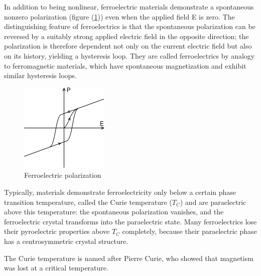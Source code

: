 \documentclass[%
 aip,
 amsmath,amssymb,
 reprint, floatfix%
]{revtex4-1}
\begin{document}
    \par
    In addition to being nonlinear, ferroelectric materials demonstrate a spontaneous nonzero polarization (figure (\ref{fig:ferro})) even when the applied field E is zero. The distinguishing feature of ferroelectrics is that the spontaneous polarization can be reversed by a suitably strong applied electric field in the opposite direction; the polarization is therefore dependent not only on the current electric field but also on its history, yielding a hysteresis loop. They are called ferroelectrics by analogy to ferromagnetic materials, which have spontaneous magnetization and exhibit similar hysteresis loops.
    \begin{figure}
        \centering
        \includegraphics{Figures/160px-Ferroelectric_polarisation.svg.png}
        \caption{Ferroelectric polarization}
        \label{fig:ferro}
    \end{figure}
    \par
    Typically, materials demonstrate ferroelectricity only below a certain phase transition temperature, called the Curie temperature ($T_C$) and are paraelectric above this temperature: the spontaneous polarization vanishes, and the ferroelectric crystal transforms into the paraelectric state. Many ferroelectrics lose their pyroelectric properties above $T_C$ completely, because their paraelectric phase has a centrosymmetric crystal structure.
    \par
    The Curie temperature is named after Pierre Curie, who showed that magnetism was lost at a critical temperature.
\end{document}
